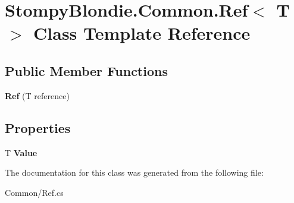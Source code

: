 \hypertarget{class_stompy_blondie_1_1_common_1_1_ref}{}\section{Stompy\+Blondie.\+Common.\+Ref$<$ T $>$ Class Template Reference}
\label{class_stompy_blondie_1_1_common_1_1_ref}
\subsection*{Public Member Functions}
\begin{DoxyCompactItemize}
\item 
\mbox{\label{class_stompy_blondie_1_1_common_1_1_ref_aee4416d4052c496f2243b78d2227b634}} 
{\bfseries Ref} (T reference)
\end{DoxyCompactItemize}
\subsection*{Properties}
\begin{DoxyCompactItemize}
\item 
\mbox{\label{class_stompy_blondie_1_1_common_1_1_ref_affb9fdf7ad5b2ccb82519015357364a1}} 
T {\bfseries Value}
\end{DoxyCompactItemize}


The documentation for this class was generated from the following file\+:\begin{DoxyCompactItemize}
\item 
Common/Ref.\+cs\end{DoxyCompactItemize}
